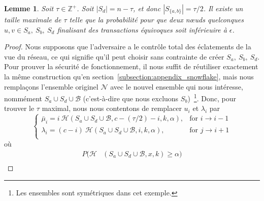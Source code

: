 \documentclass[a4,twocolumn,10pt]{article}
\newtheorem{lemma}[theorem]{Lemme}
\theoremstyle{definition}
\begin{document}
\begin{appendices}
{\begin{lemma}
Soit $\tau \in \mathbb{Z}^{+}$. Soit $|S_d| = n - \tau$, et donc $|S_{\{a, b\}}| = \tau/2$. Il existe un taille maximale de $\tau$ telle que la probabilité pour que deux nœuds quelconques $u, v \in S_a,\ S_b,\ S_d$ finalisant des transactions équivoques soit inférieuire à $\epsilon$. 
\end{lemma}
\begin{proof}
Nous supposons que l'adversaire a le contrôle total des éclatements de la vue du réseau, ce qui signifie qu'il peut choisir sans contrainte de créer $S_a,\ S_b,\ S_d$. Pour prouver la sécurité de fonctionnement, il nous suffit de réutiliser exac\-tement la même construction qu'en section~\ref{subsection:appendix_snowflake}, mais nous remplaçons l'ensemble originel $\mathcal{N}$ avec le nouvel ensemble qui nous intéresse, nommément $S_a \cup S_d \cup \mathcal{B}$ (c'est-à-dire que nous excluons $S_b$)~\footnote{Les ensembles sont symétriques dans cet exemple.}. Donc, pour trouver le $\tau$ maximal, nous nous contentons de remplacer $u_i$ et $\lambda_i$ par
\begin{equation}
    \begin{cases}
        \bar \mu_i = i\ \mathcal{H}(S_a \cup S_d \cup \mathcal{B}, c-(\tau/2)-i, k, \alpha), & \text{for } i \rightarrow i - 1 \\
        \lambda_i = (c-i)\ \mathcal{H}(S_a \cup S_d \cup \mathcal{B}, i, k, \alpha), & \text{for } j \rightarrow i + 1 \\
    \end{cases}
\end{equation}
où
\begin{equation}
\begin{split}
P(\mathcal{H}&(S_a \cup S_d \cup \mathcal{B}, x, k) \geq \alpha)\\

\end{split}
\end{equation}
\end{proof}}
\end{appendices}
\end{document}
